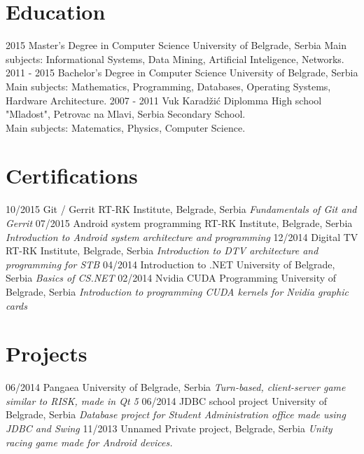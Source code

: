 \documentclass[]{rankovic-cv}
\begin{document}
\section{Education}
\begin{entrylist}
  \entry
    {2015}
    {Master's Degree in Computer Science}
    {University of Belgrade, Serbia}
    {Main subjects: Informational Systems, Data Mining, Artificial Inteligence, Networks.}
  \entry
    {2011 - 2015}
    {Bachelor's Degree in Computer Science}
    {University of Belgrade, Serbia}
    {Main subjects: Mathematics, Programming, Databases, Operating Systems, Hardware Architecture.}
  \entry
    {2007 - 2011}
    {Vuk Karadžić Diplomma}
    {High school "Mladost", Petrovac na Mlavi, Serbia}
    {Secondary School.\\
    Main subjects: Matematics, Physics, Computer Science.}
\end{entrylist}

\section{Certifications}
\begin{entrylist}
  \entry
    {10/2015}
    {Git / Gerrit}
    {RT-RK Institute, Belgrade, Serbia}
    {\emph{Fundamentals of Git and Gerrit}}
  \entry
    {07/2015}
    {Android system programming}
    {RT-RK Institute, Belgrade, Serbia}
    {\emph{Introduction to Android system architecture and programming}}
  \entry
    {12/2014}
    {Digital TV}
    {RT-RK Institute, Belgrade, Serbia}
    {\emph{Introduction to DTV architecture and programming for STB}}
  \entry
    {04/2014}
    {Introduction to .NET }
    {University of Belgrade, Serbia}
    {\emph{Basics of CS.NET}}
  \entry
    {02/2014}
    {Nvidia CUDA Programming}
    {University of Belgrade, Serbia}
    {\emph{Introduction to programming CUDA kernels for Nvidia graphic cards}}
\end{entrylist}

\section{Projects}
\begin{entrylist}
  \entry
    {06/2014}
    {Pangaea}
    {University of Belgrade, Serbia}
    {\emph{Turn-based, client-server game similar to RISK, made in Qt 5}}
  \entry
    {06/2014}
    {JDBC school project}
    {University of Belgrade, Serbia}
    {\emph{Database project for Student Administration office made using JDBC and Swing}}
  \entry
    {11/2013}
    {Unnamed}
    {Private project, Belgrade, Serbia}
    {\emph{Unity racing game made for Android devices.}}
  
\end{entrylist}
\end{document}
